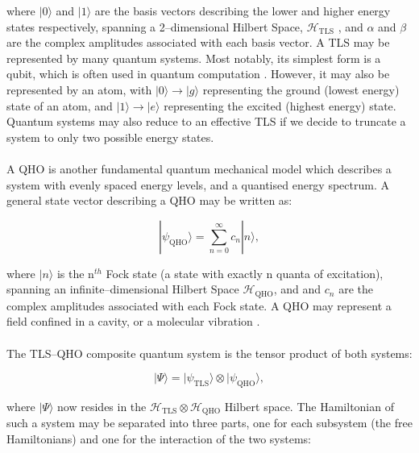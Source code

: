 \documentclass[11pt]{article}
\begin{document}
where $|0\rangle$ and $|1\rangle$ are the basis vectors describing the lower and higher energy states respectively, spanning a 2--dimensional Hilbert Space, $\mathcal{H}_{\scriptscriptstyle \text{TLS}}$ , and $\alpha$ and $\beta$ are the complex amplitudes associated with each basis vector. A TLS may be represented by many quantum systems. Most notably, its simplest form is a qubit, which is often used in quantum computation \cite{TLS2024-qubits}. However, it may also be represented by an atom, with $|0\rangle \rightarrow |g\rangle$ representing the ground (lowest energy) state of an atom, and $|1\rangle \rightarrow |e\rangle$ representing the excited (highest energy) state. Quantum systems may also reduce to an effective TLS if we decide to truncate a system to only two possible energy states. \\
\\
A QHO is another fundamental quantum mechanical model which describes a system with evenly spaced energy levels, and a quantised energy spectrum. A general state vector describing a QHO may be written as:

\begin{equation}
|\psi_{\scriptscriptstyle \text{QHO}}\rangle = \sum_{n=0}^\infty c_n |n\rangle,
\end{equation}

where $|n\rangle$ is the n$^{th}$ Fock state (a state with exactly n quanta of excitation), spanning an infinite--dimensional Hilbert Space $\mathcal{H}_{\scriptscriptstyle \text{QHO}}$, and and $c_n$ are the complex amplitudes associated with each Fock state. A QHO may represent a field confined in a cavity, or a molecular vibration \cite{Context2004-CQED_JCM}.\\
\\
The TLS--QHO composite quantum system is the tensor product of both systems:

\begin{equation}
    |\Psi\rangle = |\psi_{\scriptscriptstyle \text{TLS}}\rangle \otimes |\psi_{\scriptscriptstyle \text{QHO}}\rangle,
\end{equation}

where $|\Psi\rangle$ now resides in the $\mathcal{H}_{\scriptscriptstyle \text{TLS}} \otimes\mathcal{H}_{\scriptscriptstyle \text{QHO}}$ Hilbert space. The Hamiltonian of such a system may be separated into three parts, one for each subsystem (the free Hamiltonians) and one for the interaction of the two systems:
\end{document}

